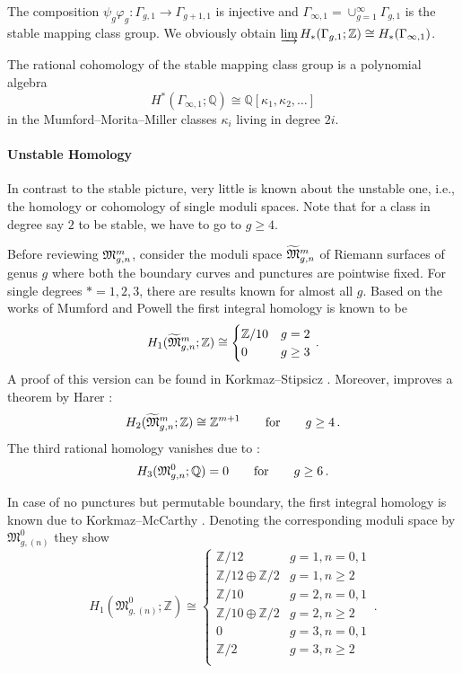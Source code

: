 The composition $\psi_g \varphi_g \colon \Gamma_{g,1} \to \Gamma_{g+1,1}$ is injective and $\Gamma_{\infty,1} = \cup_{g=1}^\infty \Gamma_{g,1}$ is the stable mapping class group.
We obviously obtain $\varinjlim H_\ast( \Gamma_{g,1}; \mathbb Z ) \cong H_\ast(\Gamma_{\infty,1})$.
\begin{thm*}
    The rational cohomology of the stable mapping class group is a polynomial algebra
    \[
        H^\ast( \Gamma_{\infty,1}; \mathbb Q ) \cong \mathbb Q[ \kappa_1, \kappa_2, \ldots ]
    \]
    in the Mumford--Morita--Miller classes $\kappa_i$ living in degree $2i$.
\end{thm*}

\paragraph{Unstable Homology}
In contrast to the stable picture, very little is known about the unstable one, i.e., the homology or cohomology of single moduli spaces.
Note that for a class in degree say $2$ to be stable, we have to go to $g \ge 4$.

Before reviewing $\Modspc$, consider the moduli space $\tildeModspc$ of Riemann surfaces of genus $g$ where both the boundary curves and punctures are pointwise fixed.
For single degrees $\ast = 1,2,3$, there are results known for almost all $g$.
Based on the works of Mumford \cite{Mumford1967} and Powell \cite{Powell1978} the first integral homology is known to be
\[
    H_1(\tildeModspc; \mathbb Z) \cong
        \begin{cases}
            \mathbb Z / 10      & g=2 \\
            0                   & g\ge3
        \end{cases} \,.
\]
A proof of this version can be found in Korkmaz--Stipsicz \cite{KorkmazStipsicz2003}.
Moreover, \cite{KorkmazStipsicz2003} improves a theorem by Harer \cite[Theorem 0.a]{Harer1991}:
\[
    H_2(\tildeModspc; \mathbb Z) \cong \mathbb Z^{m+1} \mspc{for}{20} g \ge 4 \,.
\]
The third rational homology vanishes due to \cite[Theorem 0.b]{Harer1991}:
\[
    H_3(\mathfrak{M}_{g,n}^0; \mathbb Q) = 0 \mspc{for}{20} g \ge 6 \,.
\]

In case of no punctures but permutable boundary, the first integral homology is known due to Korkmaz--McCarthy \cite[Theorem 3.12]{KorkmazMcCarthy2000}.
Denoting the corresponding moduli space by $\mathfrak M_{g,(n)}^0$ they show
\[
    H_1( \mathfrak M_{g,(n)}^0; \mathbb Z) \cong
    \begin{cases}
        \mathbb Z / 12                          & g=1, n=0,1 \\
        \mathbb Z / 12 \oplus \mathbb Z/ 2      & g=1, n\ge2 \\
        \mathbb Z / 10                          & g=2, n=0,1 \\
        \mathbb Z / 10 \oplus \mathbb Z/ 2      & g=2, n\ge2 \\
        0                                       & g=3, n=0,1 \\
        \mathbb Z / 2                           & g=3, n\ge2 \\
    \end{cases} \,.
\]

